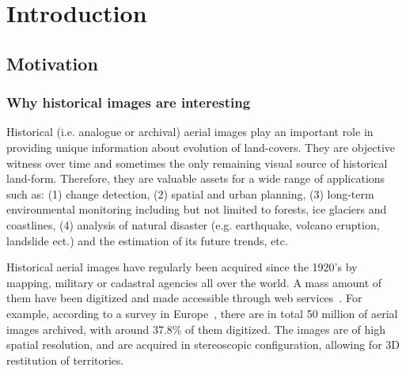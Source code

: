 
\chapter{Introduction}
\label{chap:intro}
\minitoc

\section{Motivation}
\subsection{Why historical images are interesting}
Historical (i.e. analogue or archival) aerial images play an important role in providing unique information about evolution of land-covers. 
They are objective witness over time and sometimes the only remaining visual source of historical land-form. Therefore, they are valuable assets for a wide range of applications such as: (1) change detection, (2) spatial and urban planning, (3) long-term environmental monitoring including but not limited to forests, ice glaciers and coastlines, (4) analysis of natural disaster (e.g. earthquake, volcano eruption, landslide ect.) and the estimation of its future trends, etc.
\par
Historical aerial images have regularly been acquired since the 1920’s by mapping, military or cadastral agencies all over the world. A mass amount of them have been digitized and made accessible through web services~\cite{sebastien2019archiving,earthexplorer,remonterletemps}. 
For example, according to a survey in Europe~\cite{sebastien2019archiving}, there are in total 50 million of aerial images archived, with around 37.8\% of them digitized.
The images are of high spatial resolution, and are acquired in stereoscopic configuration, allowing for 3D restitution of territories. 
